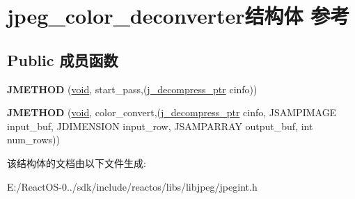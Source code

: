 \hypertarget{structjpeg__color__deconverter}{}\section{jpeg\+\_\+color\+\_\+deconverter结构体 参考}
\label{structjpeg__color__deconverter}
\subsection*{Public 成员函数}
\begin{DoxyCompactItemize}
\item 
\mbox{\label{structjpeg__color__deconverter_a90ddfc502a2aadc44f157007a3e49056}} 
{\bfseries J\+M\+E\+T\+H\+OD} (\hyperlink{interfacevoid}{void}, start\+\_\+pass,(\hyperlink{structjpeg__decompress__struct}{j\+\_\+decompress\+\_\+ptr} cinfo))
\item 
\mbox{\label{structjpeg__color__deconverter_ab0fedad382d6b40b3698181271bb4ba4}} 
{\bfseries J\+M\+E\+T\+H\+OD} (\hyperlink{interfacevoid}{void}, color\+\_\+convert,(\hyperlink{structjpeg__decompress__struct}{j\+\_\+decompress\+\_\+ptr} cinfo, J\+S\+A\+M\+P\+I\+M\+A\+GE input\+\_\+buf, J\+D\+I\+M\+E\+N\+S\+I\+ON input\+\_\+row, J\+S\+A\+M\+P\+A\+R\+R\+AY output\+\_\+buf, int num\+\_\+rows))
\end{DoxyCompactItemize}


该结构体的文档由以下文件生成\+:\begin{DoxyCompactItemize}
\item 
E\+:/\+React\+O\+S-\/0../sdk/include/reactos/libs/libjpeg/jpegint.\+h\end{DoxyCompactItemize}
